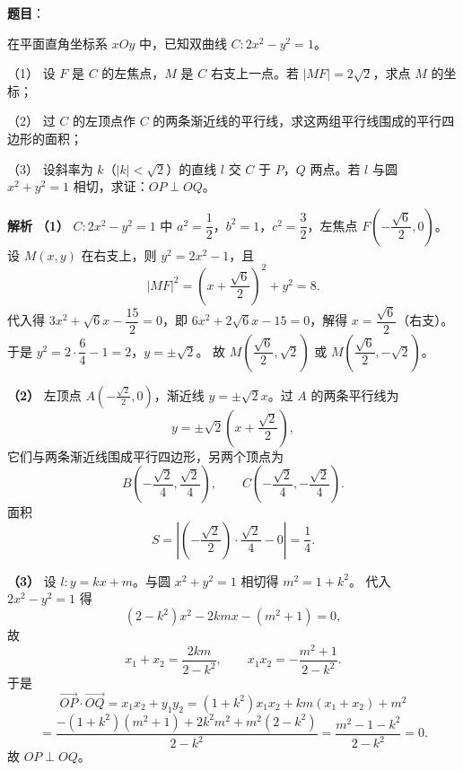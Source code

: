 \begin{answer}

\textbf{题目}：

在平面直角坐标系 $xOy$ 中，已知双曲线 $C:2x^2-y^2=1$。

（1） 设 $F$ 是 $C$ 的左焦点，$M$ 是 $C$ 右支上一点。若 $|MF|=2\sqrt2$，求点 $M$ 的坐标；

（2） 过 $C$ 的左顶点作 $C$ 的两条渐近线的平行线，求这两组平行线围成的平行四边形的面积；

（3） 设斜率为 $k$（$|k|<\sqrt2$）的直线 $l$ 交 $C$ 于 $P$，$Q$ 两点。若 $l$ 与圆 $x^2+y^2=1$ 相切，求证：$OP\perp OQ$。

\textbf{解析}
\textbf{（1）} $C:2x^2-y^2=1$ 中 $a^2=\dfrac12$，$b^2=1$，$c^2=\dfrac32$，左焦点 $F\left(-\dfrac{\sqrt6}2,0\right)$。
设 $M(x,y)$ 在右支上，则 $y^2=2x^2-1$，且
\nopagebreak[4]
\[|MF|^2=\left(x+\frac{\sqrt6}2\right)^2+y^2=8.\]
代入得 $3x^2+\sqrt6x-\dfrac{15}2=0$，即 $6x^2+2\sqrt6x-15=0$，解得 $x=\dfrac{\sqrt6}2$（右支）。于是 $y^2=2\cdot\dfrac64-1=2$，$y=\pm\sqrt2$。
故 $M\left(\dfrac{\sqrt6}2,\sqrt2\right)$ 或 $M\left(\dfrac{\sqrt6}2,-\sqrt2\right)$。

\textbf{（2）} 左顶点 $A\left(-\frac{\sqrt2}2,0\right)$，渐近线 $y=\pm\sqrt2x$。过 $A$ 的两条平行线为
\nopagebreak[4]
\[y=\pm\sqrt2\left(x+\frac{\sqrt2}2\right),\]
它们与两条渐近线围成平行四边形，另两个顶点为
\nopagebreak[4]
\[B\left(-\frac{\sqrt2}4,\frac{\sqrt2}4\right),\qquad C\left(-\frac{\sqrt2}4,-\frac{\sqrt2}4\right).\]
面积
\nopagebreak[4]
\[S=\left|\left(-\frac{\sqrt2}2\right)\cdot\frac{\sqrt2}4-0\right|=\frac14.\]

\textbf{（3）} 设 $l:y=kx+m$。与圆 $x^2+y^2=1$ 相切得 $m^2=1+k^2$。
代入 $2x^2-y^2=1$ 得
\nopagebreak[4]
\[(2-k^2)x^2-2kmx-(m^2+1)=0,\]
故
\nopagebreak[4]
\[x_1+x_2=\frac{2km}{2-k^2},\qquad x_1x_2=-\frac{m^2+1}{2-k^2}.\]
于是
\nopagebreak[4]
\[\overrightarrow{OP}\cdot\overrightarrow{OQ}=x_1x_2+y_1y_2=(1+k^2)x_1x_2+km(x_1+x_2)+m^2\]
\nopagebreak[4]
\[=\frac{-(1+k^2)(m^2+1)+2k^2m^2+m^2(2-k^2)}{2-k^2}=\frac{m^2-1-k^2}{2-k^2}=0.\]
故 $OP\perp OQ$。




\end{answer}
